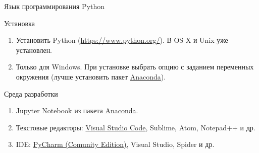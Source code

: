 \documentclass[aspectratio=169]{beamer}	%
\begin{document}
\begin{frame}[fragile]{Язык программирования Python}
\begin{alertblock}{Установка}
\begin{enumerate}
	\item Установить Python (\textcolor{linkcolor}{\url{https://www.python.org/}}). В OS X и Unix уже установлен.
	\item Только для Windows. При установке выбрать опцию с заданием переменных окружения (лучше установить пакет \href{https://www.anaconda.com/products/individual}{\textcolor{linkcolor}{Anaconda}}).
\end{enumerate}
\end{alertblock}
\begin{alertblock}{Среда разработки}
\begin{enumerate}
	\item Jupyter Notebook из пакета \href{https://www.anaconda.com/products/individual}{\textcolor{linkcolor}{Anaconda}}.
	\item Текстовые редакторы: \href{https://code.visualstudio.com/}{\textcolor{linkcolor}{Visual Studio Code}}, Sublime, Atom, Notepad++ и др.
	\item IDE: \href{https://www.jetbrains.com/pycharm/download/#section=windows}{\textcolor{linkcolor}{PyCharm (Comunity Edition)}}, Visual Studio, Spider и др.
\end{enumerate}
\end{alertblock}
\vfill
\end{frame}
\end{document}

